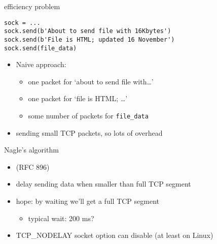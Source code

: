 \begin{frame}[fragile]{efficiency problem}
\begin{Verbatim}[fontsize=\small]
sock = ...
sock.send(b'About to send file with 16Kbytes')
sock.send(b'File is HTML; updated 16 November')
sock.send(file_data)
\end{Verbatim}
\begin{itemize}
\item Naive approach:
    \begin{itemize}
    \item one packet for `about to send file with\ldots'
    \item one packet for `file is HTML; \ldots'
    \item some number of packets for \texttt{file\_data}
    \end{itemize}
\item sending small TCP packets, so lots of overhead
\end{itemize}
\end{frame}

\begin{frame}{Nagle's algorithm}
\begin{itemize}
\item (RFC 896)
\item delay sending data when smaller than full TCP segment
\item hope: by waiting we'll get a full TCP segment
    \begin{itemize}
    \item typical wait: 200 ms?
    \end{itemize}
\vspace{.5cm}
\item TCP\_NODELAY socket option can disable (at least on Linux)
\end{itemize}
\end{frame}
